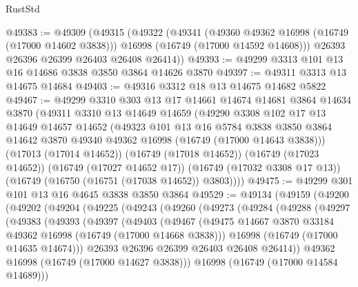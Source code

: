 \begin{lexlean}{RustStd}
\begin{coremodule}
@49383 := @49309
    (@49315
      (@49322
        (@49341
          (@49360 @49362 @16998 (@16749 (@17000 @14602 @3838)))
          @16998
          (@16749 (@17000 @14592 @14608)))
        @26393
        @26396
        @26399
        @26403
        @26408
        @26414))
@49393 := @49299 @3313 @101 @13 @16 @14686 @3838 @3850 @3864 @14626 @3870
@49397 := @49311 @3313 @13 @14675 @14684
@49403 := @49316 @3312 @18 @13 @14675 @14682 @5822
@49467 := @49299
    @3310
    @303
    @13
    @17
    @14661
    @14674
    @14681
    @3864
    @14634
    @3870
    (@49311
      @3310
      @13
      @14649
      @14659
      (@49290
        @3308
        @102
        @17
        @13
        @14649
        @14657
        @14652
        (@49323
          @101
          @13
          @16
          @5784
          @3838
          @3850
          @3864
          @14642
          @3870
          @49340
          @49362
          @16998
          (@16749 (@17000 @14643 @3838)))
        (@17013 (@17014 @14652))
        (@16749 (@17018 @14652))
        (@16749 (@17023 @14652))
        (@16749 (@17027 @14652 @17))
        (@16749 (@17032 @3308 @17 @13))
        (@16749 (@16750 (@16751 (@17038 @14652)) @3803))))
@49475 := @49299 @301 @101 @13 @16 @4645 @3838 @3850 @3864
@49529 := @49134
    (@49159
      (@49200
        (@49202
          (@49204
            (@49225
              (@49243
                (@49260
                  (@49273
                    (@49284
                      (@49288
                        (@49297
                          (@49383
                            (@49393
                              (@49397
                                (@49403
                                  (@49467
                                    (@49475
                                      @14667
                                      @3870
                                      @33184
                                      @49362
                                      @16998
                                      (@16749 (@17000 @14668 @3838)))
                                    @16998
                                    (@16749 (@17000 @14635 @14674)))
                                  @26393
                                  @26396
                                  @26399
                                  @26403
                                  @26408
                                  @26414))
                              @49362
                              @16998
                              (@16749 (@17000 @14627 @3838)))
                            @16998
                            (@16749 (@17000 @14584 @14689)))

\end{coremodule}
\end{lexlean}
